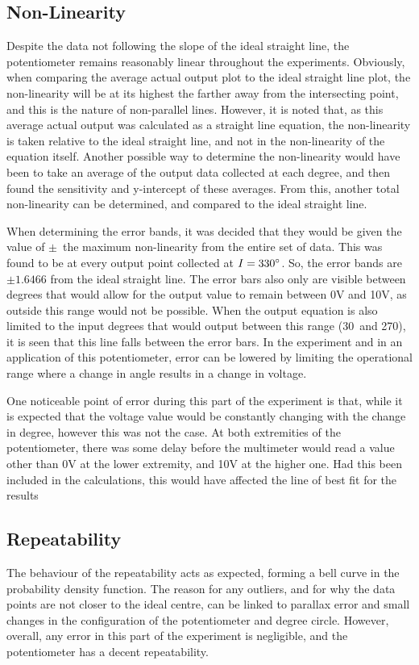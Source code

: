 \documentclass[a4,11pt]{article}
\begin{document}
\subsection{Non-Linearity}
Despite the data not following the slope of the ideal straight line, the potentiometer remains reasonably linear throughout the experiments. Obviously, when comparing the average actual output plot to the ideal straight line plot, the non-linearity will be at its highest the farther away from the intersecting point, and this is the nature of non-parallel lines. However, it is noted that, as this average actual output was calculated as a straight line equation, the non-linearity is taken relative to the ideal straight line, and not in the non-linearity of the equation itself. Another possible way to determine the non-linearity would have been to take an average of the output data collected at each degree, and then found the sensitivity and y-intercept of these averages. From this, another total non-linearity can be determined, and compared to the ideal straight line.	

When determining the error bands, it was decided that they would be given the value of $\pm$\ the maximum non-linearity from the entire set of data. This was found to be at every output point collected at $I=330\degree$. So, the error bands are $\pm1.6466$ from the ideal straight line. The error bars also only are visible between degrees that would allow for the output value to remain between 0V and 10V, as outside this range would not be possible. When the output equation is also limited to the input degrees that would output between this range (30\degree\ and 270\degree), it is seen that this line falls between the error bars. In the experiment and in an application of this potentiometer, error can be lowered by limiting the operational range where a change in angle results in a change in voltage.

One noticeable point of error during this part of the experiment is that, while it is expected that the voltage value would be constantly changing with the change in degree, however this was not the case. At both extremities of the potentiometer, there was some delay before the multimeter would read a value other than 0V at the lower extremity, and 10V at the higher one. Had this been included in the calculations, this would have affected the line of best fit for the results
\subsection{Repeatability}
The behaviour of the repeatability acts as expected, forming a bell curve in the probability density function. The reason for any outliers, and for why the data points are not closer to the ideal centre, can be linked to parallax error and small changes in the configuration of the potentiometer and degree circle. However, overall, any error in this part of the experiment is negligible, and the potentiometer has a decent repeatability.
\end{document}

